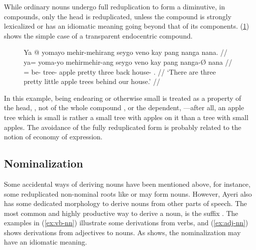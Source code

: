 While ordinary nouns undergo full reduplication to form a diminutive, in 
compounds, only the head is reduplicated, unless the compound is strongly 
lexicalized or has an idiomatic meaning going beyond that of its components. 
(\ref{ex:compredup}) shows the simple case of a transparent endocentric 
compound.

\begin{figure}[h]
\ex\label{ex:compredup}\begingl
	\gla Ya @ yomayo mehir-mehirang seygo veno kay pang nanga nana. //
	\glb ya= yoma-yo mehir\til{}mehir-ang seygo veno kay pang nanga-Ø nana //
	\glc \LocT{}= be-\TsgN{} \Dim{}\til{}tree-\Aarg{} apple pretty three 
		back house-\Top{} \Fpl{}.\Gen{} //
	\glft `There are three pretty little apple trees behind our house.' //
\endgl\xe
\end{figure}

In this example, being endearing or otherwise small is treated as a property of
the head, , not of the whole compound 
, or the dependent, 
---after all, an apple tree which is small is 
rather a small tree with apples on it than a tree with small apples. The 
avoidance of the fully reduplicated form 
 is probably related to
the notion of economy of expression.


\subsection{Nominalization}
\label{subsec:nominalization}

Some accidental ways of deriving nouns have been mentioned above, for instance,
some reduplicated non-nominal roots like  or
 may form nouns. However, Ayeri also has some 
dedicated morphology to derive nouns from other parts of speech. The most 
common and highly productive way to derive a noun, is the suffix 
. The examples in (\ref{ex:vb-nn}) illustrate some derivations 
from verbs, and (\ref{ex:adj-nn}) shows derivations from adjectives to nouns. 
As  shows, the nominalization may have an idiomatic 
meaning.

